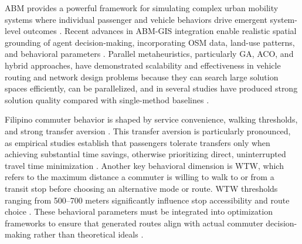 {\ac{ABM} provides a powerful framework for simulating complex urban mobility systems where individual passenger and vehicle behaviors drive emergent system-level outcomes \citep{mehdizadeh2022, li2025}. Recent advances in \ac{ABM}-\ac{GIS} integration enable realistic spatial grounding of agent decision-making, incorporating \ac{OSM} data, land-use patterns, and behavioral parameters \citep{wozniak2020, boeing2025}. Parallel metaheuristics, particularly \ac{GA}, \ac{ACO}, and hybrid approaches, have demonstrated scalability and effectiveness in vehicle routing and network design problems because they can search large solution spaces efficiently, can be parallelized, and in several studies have produced strong solution quality compared with single-method baselines \citep{wens2025, alkhalifa2025, wu2024}.

Filipino commuter behavior is shaped by service convenience, walking thresholds, and strong transfer aversion \citep{upncts2021b, huang2022}. This transfer aversion is particularly pronounced, as empirical studies establish that passengers tolerate transfers only when achieving substantial time savings, otherwise prioritizing direct, uninterrupted travel time minimization \citep{harris2022, huang2022}. Another key behavioral dimension is \ac{WTW}, which refers to the maximum distance a commuter is willing to walk to or from a transit stop before choosing an alternative mode or route. \ac{WTW} thresholds ranging from 500–700 meters significantly influence stop accessibility and route choice \citep{ha2023, karesdotter2022}. These behavioral parameters must be integrated into optimization frameworks to ensure that generated routes align with actual commuter decision-making rather than theoretical ideals \citep{upncts2021b}.

}
